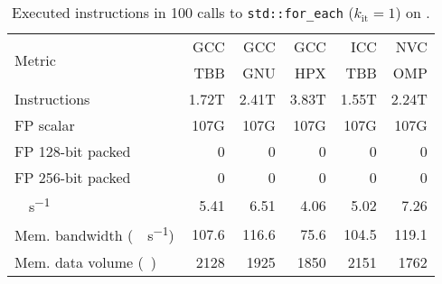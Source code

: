 \begin{table}[t]
	\centering
	\caption*{Executed instructions in 100 calls to \texttt{std::for\_each} ($k_\text{it} = 1$) on \machhydralong.\vspace{-15pt}}
	\label{tab:foreach-hw-counters}
	\begin{adjustbox}{max width=\linewidth}
	\begin{tabular}{lrrrrr}
		\toprule
		\multirow{2}{*}{Metric}                       & GCC   & GCC   & GCC   & ICC   & NVC   \\
		                                              & TBB   & GNU   & HPX   & TBB   & OMP   \\
		\midrule
		Instructions                                  & 1.72T & 2.41T & 3.83T & 1.55T & 2.24T \\
		FP scalar                                     & 107G  & 107G  & 107G  & 107G  & 107G  \\
		FP 128-bit packed                             & 0     & 0     & 0     & 0     & 0     \\
		FP 256-bit packed                             & 0     & 0     & 0     & 0     & 0     \\
		\unit{\giga\FLOP\per\second}                  & 5.41  & 6.51  & 4.06  & 5.02  & 7.26  \\
		Mem. bandwidth (\unit{\gibi\byte\per\second}) & 107.6 & 116.6 & 75.6  & 104.5 & 119.1 \\
		Mem. data volume (\unit{\gibi\byte})          & 2128  & 1925  & 1850  & 2151  & 1762  \\
		\bottomrule
	\end{tabular}
	\end{adjustbox}
\end{table}


